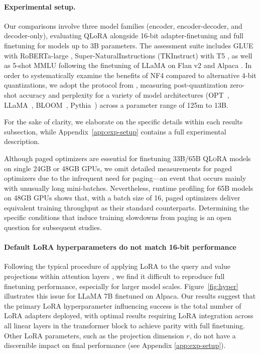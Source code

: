 \paragraph{Experimental setup.} Our comparisons involve three model families (encoder, encoder-decoder, and decoder-only), evaluating QLoRA alongside 16-bit adapter-finetuning and full finetuning for models up to 3B parameters. The assessment suite includes GLUE \citep{wang2018glue} with RoBERTa-large \citep{liu2019roberta}, Super-NaturalInstructions (TKInstruct) \citep{wang2022super} with T5 \citep{t5}, as well as 5-shot MMLU \citep{hendrycksmeasuring} following the finetuning of LLaMA on Flan v2 \citep{longpre2023flan} and Alpaca \citep{alpaca}. In order to systematically examine the benefits of NF4 compared to alternative 4-bit quantizations, we adopt the protocol from \citet{dettmers2022case}, measuring post-quantization zero-shot accuracy and perplexity for a variety of model architectures (OPT~\citep{zhang2022opt}, LLaMA~\citep{touvron2023llama}, BLOOM~\citep{scao2022bloom}, Pythia~\citep{biderman2023pythia}) across a parameter range of 125m to 13B.

For the sake of clarity, we elaborate on the specific details within each results subsection, while Appendix~\ref{app:exp-setup} contains a full experimental description.

Although paged optimizers are essential for finetuning 33B/65B \textsc{QLoRA} models on single 24GB or 48GB GPUs, we omit detailed measurements for paged optimizers due to the infrequent need for paging—an event that occurs mainly with unusually long mini-batches. Nevertheless, runtime profiling for 65B models on 48GB GPUs shows that, with a batch size of 16, paged optimizers deliver equivalent training throughput as their standard counterparts. Determining the specific conditions that induce training slowdowns from paging is an open question for subsequent studies.

\paragraph{Default LoRA hyperparameters do not match 16-bit performance} 

Following the typical procedure of applying LoRA to the query and value projections within attention layers \citep{hu2021lora}, we find it difficult to reproduce full finetuning performance, especially for larger model scales. Figure~\ref{fig:hyper} illustrates this issue for LLaMA 7B finetuned on Alpaca. Our results suggest that the primary LoRA hyperparameter influencing success is the total number of LoRA adapters deployed, with optimal results requiring LoRA integration across all linear layers in the transformer block to achieve parity with full finetuning. Other LoRA parameters, such as the projection dimension $r$, do not have a discernible impact on final performance (see Appendix \ref{app:exp-setup}).


